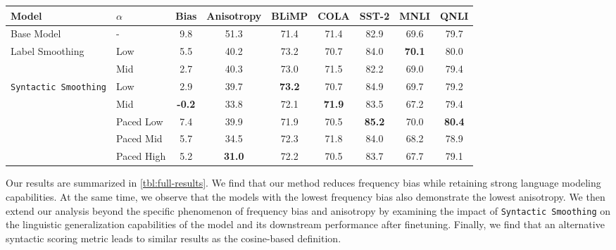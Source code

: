 \begin{table*}[ht!]
\centering
\small
\begin{tabular}{ll||cc|ccccc}
\toprule
\textbf{Model}  & $\alpha$ & \textbf{Bias}  & \textbf{Anisotropy} & \textbf{BLiMP} & \textbf{COLA} & \textbf{SST-2} & \textbf{MNLI} & \textbf{QNLI}  \\
\midrule
Base Model & -&9.8 & 51.3 & 71.4 & 71.4 & 82.9 & 69.6 & 79.7 \\
\midrule
\multirow{2}{*}{Label Smoothing} &Low & 5.5 & 40.2 & 73.2 & 70.7 & 84.0 & \textbf{70.1} & 80.0 \\
&Mid & 2.7  & 40.3 & 73.0 & 71.5 & 82.2 & 69.0 & 79.4 \\
\midrule
\multirow{5}{*}{\texttt{Syntactic Smoothing}}&Low  & 2.9 & 39.7 & \textbf{73.2} & 70.7 & 84.9 & 69.7 & 79.2 \\
&Mid  & \textbf{-0.2} & 33.8 & 72.1 & \textbf{71.9} & 83.5 & 67.2 & 79.4 \\
&Paced Low & 7.4 & 39.9 & 71.9 & 70.5 & \textbf{85.2} & 70.0 & \textbf{80.4}\\ 
&Paced Mid& 5.7 & 34.5 & 72.3 & 71.8 & 84.0 & 68.2 & 78.9\\ 
&Paced High & 5.2 & \textbf{31.0} & 72.2 & 70.5 & 83.7 & 67.7 & 79.1 \\ 
\bottomrule
\end{tabular}
\caption{\label{tbl:full-results} We report bias~($\downarrow$), anisotropy~($\downarrow$), BLiMP~($\uparrow$) score, and accuracy or correlation scores ($\uparrow$) on two downstream sentence-level tasks -- COLA and SST-2 -- and two downstream language inference tasks -- MNLI and QNLI -- for our MLM baseline, two label smoothing (LS) baselines, and five \texttt{Syntactic Smoothing} (\texttt{SyS}) variants. \texttt{SyS}-P variants use linear pacing to reduce the smoothing factor to zero over training.}
\end{table*}

Our results are summarized in \cref{tbl:full-results}. We find that our method reduces frequency bias while retaining strong language modeling capabilities. At the same time, we observe that the models with the lowest frequency bias also demonstrate the lowest anisotropy. We then extend our analysis beyond the specific phenomenon of frequency bias and anisotropy by examining the impact of \texttt{Syntactic Smoothing} on the linguistic generalization capabilities of the model and its downstream performance after finetuning. Finally, we find that an alternative syntactic scoring metric leads to similar results as the cosine-based definition.

